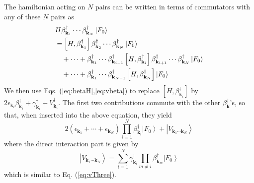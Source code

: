 \documentclass[aps,prb,superscriptaddress,showpacs,reprint,lengthcheck]{revtex4}
\newcommand{\vk}{\ensuremath{\mathbf{k}}}
\begin{document}
The hamiltonian acting on $N$ pairs can be written in terms of commutators with any of these $N$ pairs as 
\begin{equation}\label{eq:HN}
\begin{split}
&H\beta^{\dagger}_{\mathbf{k} _1}\cdots\beta^{\dagger}_{\mathbf{k}
_N}\left|F_0\right> \\
&=\left[H,\beta^{\dagger}_{\mathbf{k} _1}\right]  \beta^{\dagger}_{%
\mathbf{k} _2}\cdots\beta^{\dagger}_{\mathbf{k} _N}\left|F_0\right> \\
&\quad+\cdots+\beta^{\dagger}_{\mathbf{k} _1}\cdots\beta^{\dagger}_{\mathbf{k} _{i-1}}
\left[H,\beta^{\dagger}_{\mathbf{k} _i}\right]  \beta^{\dagger}_{\mathbf{k}
_{i+1}}\cdots \beta^{\dagger}_{\mathbf{k}_{N}}\left|F_0\right>\\
&\quad+\cdots+\beta^{\dagger}_{\mathbf{k} _1}\cdots\beta^{\dagger}_{\mathbf{k} _{N-1}}
\left[H,\beta^{\dagger}_{\mathbf{k} _N}\right] \left|F_0\right>
\end{split}
\end{equation}
We then use Eqs. (\ref{eq:betaH},\ref{eq:vbeta}) to replace $\left[H,\beta^{\dagger}_{\mathbf{k} _i}\right]$ by $2\epsilon_{\vk_i}\beta^{\dagger}_{\vk_i}+\gamma^{\dagger}_{\vk_i}+V^{\dagger}_{\vk_i}$.  The first two contributions commute with the other $\beta^\dagger_\vk$'s, so that, when inserted into the above equation, they yield
\begin{equation}
2\left(\epsilon_{\mathbf{k} _1}+\cdots+\epsilon_{\mathbf{k} _N}\right)
\prod^N_{i=1}\beta^{\dagger}_{\mathbf{k} _i}\left|F_0\right>+\left|{V}_{\mathbf{k} _1\cdots\mathbf{k} _N}\right> 
\end{equation}
where the direct interaction part is given by 
\begin{equation}  
\left|V_{\mathbf{k} _1\cdots\mathbf{k} _N}\right> =\sum^N_{i=1}\gamma^{\dagger}_{\mathbf{k}_i}\prod_{m\neq{i}}\beta^{\dagger}_{\mathbf{k} _m}\left|F_0\right>   
\end{equation}
which is similar to Eq. (\ref{eq:vThree}). 
\end{document}

